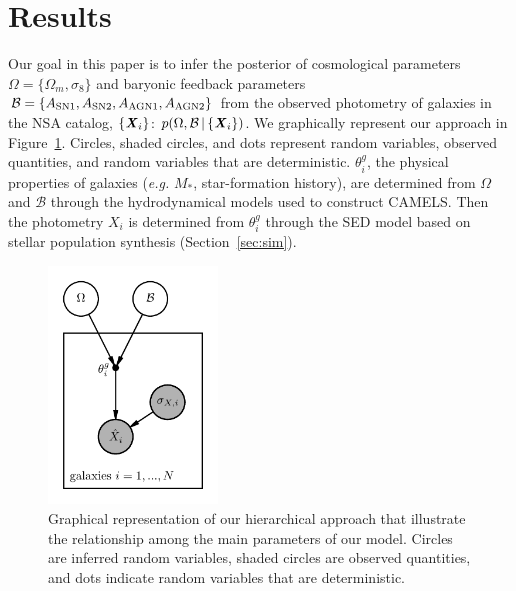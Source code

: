 \section{Results} \label{sec:results}
Our goal in this paper is to infer the posterior of cosmological parameters
$\Omega = \{ \Omega_m, \sigma_8 \}$ and baryonic feedback parameters 
$\mathcal{B} = \{ A_{\rm SN1}, A_{\rm SN2}, A_{\rm AGN1}, A_{\rm AGN2}\}$ from the observed photometry
of galaxies in the NSA catalog, $\{\textbf{\textit{X}}_i\}$: 
$p(\Omega, \mathcal{B} \,|\, \{{\textbf{\textit{X}}_i}\})$.
We graphically represent our approach in Figure~\ref{fig:graph}.
Circles, shaded circles, and dots represent random variables, observed
quantities, and random variables that are deterministic. 
$\theta_i^g$, the physical properties of galaxies (\emph{e.g.} $M_*$,
star-formation history), are determined from $\Omega$ and $\mathcal{B}$ through
the hydrodynamical models used to construct CAMELS.
Then the photometry $X_i$ is determined from $\theta_i^g$ through the SED model
based on stellar population synthesis (Section~\ref{sec:sim}).  

\begin{figure}
\begin{center}
    \includegraphics[width=0.4\textwidth]{figs/graph.pdf} 
    \caption{
        Graphical representation of our hierarchical approach that illustrate
        the relationship among the main parameters of our model. 
        Circles are inferred random variables, shaded circles are observed
        quantities, and dots indicate random variables that are deterministic.
    }\label{fig:graph}
\end{center}
\end{figure}


